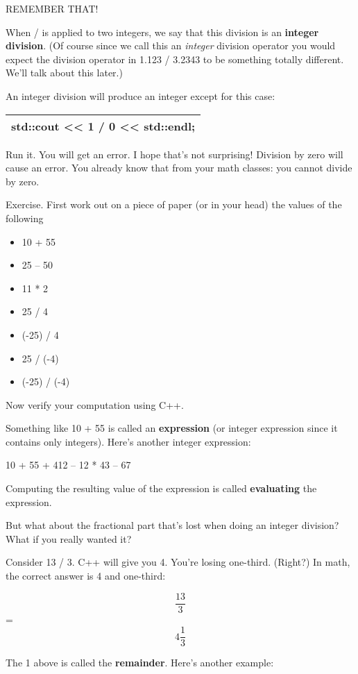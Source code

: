 \documentclass[
]{article}
\providecommand{\tightlist}{%
  \setlength{\itemsep}{0pt}\setlength{\parskip}{0pt}}
\begin{document}
REMEMBER THAT!

When / is applied to two integers, we say that this division is an
\textbf{integer division}. (Of course since we call this an
\emph{integer} division operator you would expect the division operator
in 1.123 / 3.2343 to be something totally different. We'll talk about
this later.)

An integer division will produce an integer except for this case:

\begin{longtable}[]{@{}l@{}}
\toprule
\endhead
std::cout \textless\textless{} 1 / 0 \textless\textless{}
std::endl;\tabularnewline
\bottomrule
\end{longtable}

Run it. You will get an error. I hope that's not surprising! Division by
zero will cause an error. You already know that from your math classes:
you cannot divide by zero.

Exercise. First work out on a piece of paper (or in your head) the
values of the following

\begin{itemize}
\tightlist
\item
  10 + 55
\item
  25 -- 50
\item
  11 * 2
\item
  25 / 4
\item
  (-25) / 4
\item
  25 / (-4)
\item
  (-25) / (-4)
\end{itemize}

Now verify your computation using C++.

Something like 10 + 55 is called an \textbf{expression} (or integer
expression since it contains only integers). Here's another integer
expression:

10 + 55 + 412 -- 12 * 43 -- 67

Computing the resulting value of the expression is called
\textbf{evaluating} the expression.

But what about the fractional part that's lost when doing an integer
division? What if you really wanted it?

Consider 13 / 3. C++ will give you 4. You're losing one-third. (Right?)
In math, the correct answer is 4 and one-third:

\[\frac{13}{3}\] =\[4\frac{1}{3}\]

The 1 above is called the \textbf{remainder}. Here's another example:
\end{document}
